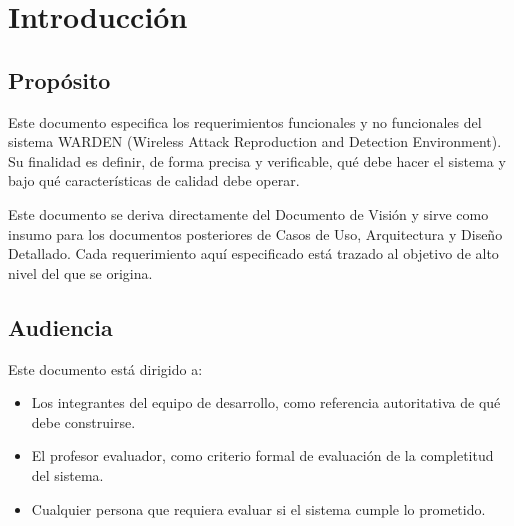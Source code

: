 \documentclass[11pt,a4paper]{article}
\begin{document}

\begin{wardenrevisions}
\end{wardenrevisions}

\tableofcontents
\newpage

\section{Introducción}

\subsection{Propósito}
Este documento especifica los requerimientos funcionales y no funcionales del
sistema WARDEN (Wireless Attack Reproduction and Detection Environment). Su
finalidad es definir, de forma precisa y verificable, qué debe hacer el
sistema y bajo qué características de calidad debe operar.

Este documento se deriva directamente del Documento de Visión y sirve como
insumo para los documentos posteriores de Casos de Uso, Arquitectura y
Diseño Detallado. Cada requerimiento aquí especificado está trazado al
objetivo de alto nivel del que se origina.

\subsection{Audiencia}
Este documento está dirigido a:

\begin{itemize}
  \item Los integrantes del equipo de desarrollo, como referencia
    autoritativa de qué debe construirse.
  \item El profesor evaluador, como criterio formal de evaluación de la
    completitud del sistema.
  \item Cualquier persona que requiera evaluar si el sistema cumple lo
    prometido.
\end{itemize}
\end{document}
